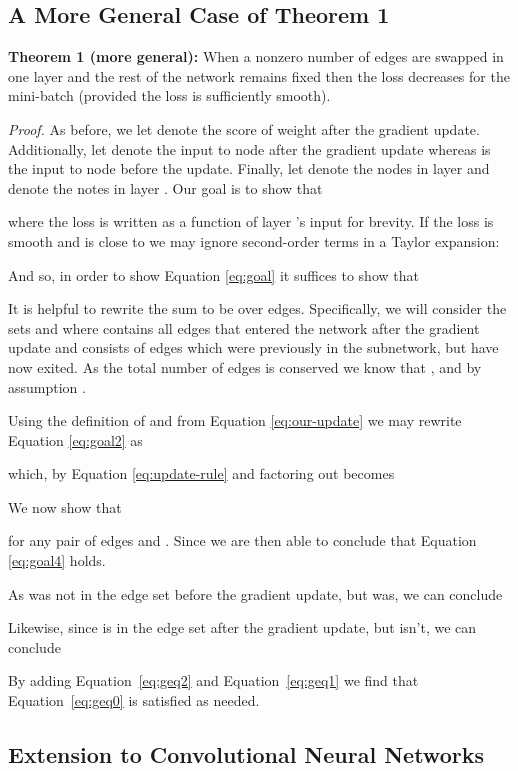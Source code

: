 \documentclass[10pt,twocolumn,letterpaper]{article}
\begin{document}
\subsection{A More General Case of Theorem 1} \label{sec:general-case}

\noindent \textbf{Theorem 1 (more general):} When a nonzero number of edges are swapped in one layer and the rest of the network remains fixed then the loss decreases for the mini-batch (provided the loss is sufficiently smooth).

\noindent \textit{Proof.} As before, we let  denote the score of weight  after the gradient update. Additionally, let  denote the input to node  after the gradient update whereas  is the input to node  before the update. Finally, let  denote the  nodes in layer  and  denote the  notes in layer . Our goal is to show that 

where the loss is written as a function of layer 's input for brevity.
If the loss is smooth and  is close to  we may ignore second-order terms in a Taylor expansion:


And so, in order to show Equation \ref{eq:goal} it suffices to show that 


It is helpful to rewrite the sum to be over edges. Specifically, we will consider the sets  and  where  contains all edges that entered the network after the gradient update and  consists of edges which were previously in the subnetwork, but have now exited. As the total number of edges is conserved we know that , and by assumption .

Using the definition of  and  from Equation \ref{eq:our-update} we may rewrite Equation \ref{eq:goal2} as

which, by Equation \ref{eq:update-rule} and factoring out  becomes

We now show that 

for any pair of edges  and . Since  we are then able to conclude that Equation \ref{eq:goal4} holds.

As  was not in the edge set before the gradient update, but  was, we can conclude 

Likewise, since  is in the edge set after the gradient update, but  isn't, we can conclude


By adding Equation~\ref{eq:geq2} and Equation~\ref{eq:geq1} we find that Equation~\ref{eq:geq0} is satisfied as needed.

\subsection{Extension to Convolutional Neural Networks} \label{sec:convolutional-case}
\end{document}
